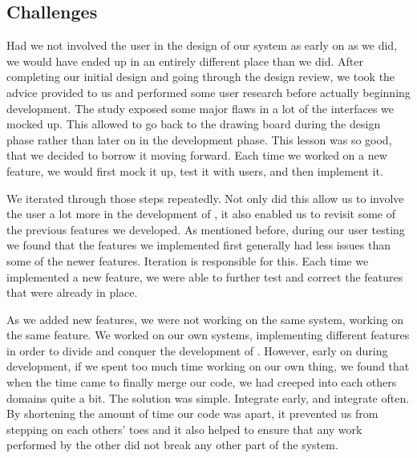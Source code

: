 \subsection{Challenges}
Had we not involved the user in the design of our system as early on as we did, we would have ended up in an entirely different place than we did. After completing our initial design and going through the design review, we took the advice provided to us and performed some user research before actually beginning development. The study exposed some major flaws in a lot of the interfaces we mocked up. This allowed to go back to the drawing board during the design phase rather than later on in the development phase. This lesson was so good, that we decided to borrow it moving forward. Each time we worked on a new feature, we would first mock it up, test it with users, and then implement it. 
\par We iterated through those steps repeatedly. Not only did this allow us to involve the user a lot more in the development of \projectTitle{}, it also enabled us to revisit some of the previous features we developed. As mentioned before, during our user testing we found that the features we implemented first generally had less issues than some of the newer features. Iteration is responsible for this. Each time we implemented a new feature, we were able to further test and correct the features that were already in place. 
\par As we added new features, we were not working on the same system, working on the same feature. We worked on our own systems, implementing different features in order to divide and conquer the development of \projectTitle{}. However, early on during development, if we spent too much time working on our own thing, we found that when the time came to finally merge our code, we had creeped into each others domains quite a bit. The solution was simple. Integrate early, and integrate often. By shortening the amount of time our code was apart, it prevented us from stepping on each others' toes and it also helped to ensure that any work performed by the other did not break any other part of the system. 

